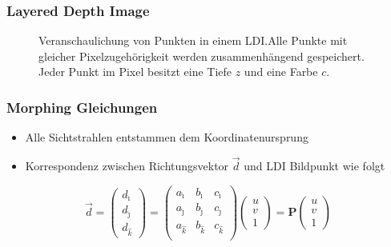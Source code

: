 \documentclass[aspectratio=169]{beamer}
\begin{document}
\begin{frame}
    \frametitle{Layered Depth Image}
    \begin{figure}
        \centering
        \resizebox{.7\linewidth}{!}{}
        \caption{Veranschaulichung von Punkten in einem LDI.\@ Alle Punkte mit
            gleicher Pixelzugehörigkeit werden zusammenhängend gespeichert. Jeder
            Punkt im Pixel besitzt eine Tiefe \(z\) und eine Farbe \(c\).}%
        \label{fig:layereddepthimage}
    \end{figure}
\end{frame}

\begin{frame}
    \frametitle{Morphing Gleichungen}
    \begin{itemize}
        \item Alle Sichtstrahlen entstammen dem Koordinatenursprung
        \item Korrespondenz zwischen Richtungsvektor \( \vec{d} \) und LDI Bildpunkt wie folgt
    \end{itemize}

    \begin{equation}
        \vec{d} =
        \begin{pmatrix}
            d_{\hat{\imath}} \\
            d_{\hat{\jmath}} \\
            d_{\hat{k}}
        \end{pmatrix} =
        \begin{pmatrix}
            a_{\hat{\imath}} &
            b_{\hat{\imath}} &
            c_{\hat{\imath}}   \\
            a_{\hat{\jmath}} &
            b_{\hat{\jmath}} &
            c_{\hat{\jmath}}   \\
            a_{\hat{k}}      &
            b_{\hat{k}}      &
            c_{\hat{k}}        \\
        \end{pmatrix}
        \begin{pmatrix}
            u \\
            v \\
            1
        \end{pmatrix} =
        \mathbf{P}
        \begin{pmatrix}
            u \\
            v \\
            1
        \end{pmatrix}
    \end{equation}
\end{frame}
\end{document}
